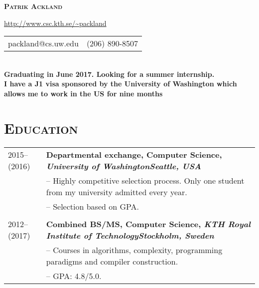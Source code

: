 \documentclass[10.5pt]{article}
\newenvironment{sect}[1][]
{ \section*{\textsc{#1}} \noindent \begin{tabular}{p{5.3em} p{48em}} }
{ \end{tabular} }
\begin{document}

\centerline{\LARGE \textbf{\textsc{Patrik Ackland}}}

\begin{center}
  \url{http://www.csc.kth.se/~packland} \\
  \vspace{0.3em}
  \begin{tabular}{l r}
    packland@cs.uw.edu&(206) 890-8507
  \end{tabular} \\
  \vspace{0.3em}
  \textbf{Graduating in June 2017. Looking for a summer internship.\\I have a J1 visa sponsored by the University of Washington which allows me to work in the US for nine months}
\end{center}

\begin{sect}[Education]
  2015--(2016)&\textbf{Departmental exchange, Computer Science, \textit{University of Washington\hfill Seattle, USA}}\\
  &-- Highly competitive selection process. Only one student from my university admitted every year.\\
  &-- Selection based on GPA.\\ \\

  2012--(2017)&\textbf{Combined BS/MS, Computer Science, \textit{KTH Royal Institute of Technology\hfill Stockholm, Sweden}}\\
  &-- Courses in algorithms, complexity, programming paradigms and compiler construction. \\
  &-- GPA: 4.8/5.0.
\end{sect}
\end{document}
